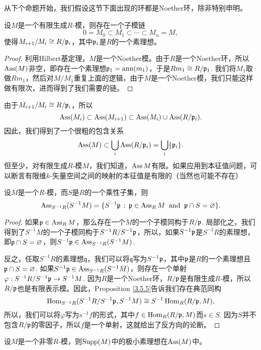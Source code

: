 从下个命题开始，我们假设这节下面出现的环都是Noether环，除非特别申明。

\begin{pro}
设$M$是一个有限生成$R$-模，则存在一个子模链
\[
	0=M_0\subset M_1\subset \cdots\subset M_n=M,
\]
使得$M_{i+1}/M_i\cong R/\mathfrak{p}_i$，其中$\mathfrak{p}_i$是$R$的一个素理想。
\end{pro}

\begin{proof}
利用Hilbert基定理，$M$是一个Noether模。由于$R$是一个Noether环，所以$\operatorname{Ass}(M)$非空，即存在一个素理想$\mathfrak{p}_1=\operatorname{ann}(m_1)$，于是$Rm_1\cong R/\mathfrak{p}_1$. 我们将$M_1$取做$Rm_1$，然后对$M/M_1$重复上面的逻辑，由于$M$是一个Noether模，我们只能这样做有限次，进而得到了我们需要的链。
\end{proof}

由于$M_{i+1}/M_i\cong R/\mathfrak{p}_i$，所以
\[
	\operatorname{Ass}(M_i)\subset \operatorname{Ass}(M_{i+1})\subset \operatorname{Ass}(M_i)\cup \operatorname{Ass}(R/\mathfrak{p}_i).
\]
因此，我们得到了一个很粗的包含关系
\[
	\operatorname{Ass}(M)\subset \bigcup_i \operatorname{Ass}(R/\mathfrak{p}_i)=\bigcup_i \{\mathfrak{p}_i\}.
\]
但至少，对有限生成$R$-模$M$，我们知道，$\operatorname{Ass} M$有限。如果应用到本征值问题，可以断言有限维$k$-矢量空间之间的映射的本征值是有限的（当然也可能不存在）

\begin{pro}
设$M$是一个$R$-模，而$S$是$R$的一个乘性子集，则
\[
	\operatorname{Ass}_{S^{-1}R}(S^{-1}M)=\{S^{-1}\mathfrak{p}\,:\,\mathfrak{p}\in \operatorname{Ass}_RM\;\;\text{and}\;\;\mathfrak p\cap S=\varnothing\}.
\]
\end{pro}

\begin{proof}
如果$\mathfrak{p}\in \operatorname{Ass}_R M$，那么存在一个$M$的一个子模同构于$R/\mathfrak{p}$. 局部化之，我们得到了$S^{-1}M$的一个子模同构于$S^{-1}R/S^{-1}\mathfrak{p}$，所以，如果$S^{-1}\mathfrak{p}$是$S^{-1}R$的素理想，即$\mathfrak{p}\cap S= \varnothing$，则$S^{-1}\mathfrak{p}\in\operatorname{Ass}_{S^{-1}R}(S^{-1}M)$.

反之，任取$S^{-1}R$的素理想$\mathfrak{q}$，我们可以将$\mathfrak{q}$写为$S^{-1}\mathfrak{p}$，其中$\mathfrak{p}$是$R$的一个素理想且$\mathfrak{p}\cap S=\varnothing$. 如果$S^{-1}\mathfrak{p}\in \operatorname{Ass}_{S^{-1}R}(S^{-1}M)$，则存在一个单射$\varphi:S^{-1}R/S^{-1}\mathfrak{p}\to S^{-1}M$. 因为$R$是一个Noether环，$R/\mathfrak{p}$是有限生成$R$-模，所以$R/\mathfrak{p}$也是有限表示模。因此，Proposition \ref{3.5.5}告诉我们存在典范同构
\[
	\operatorname{Hom}_{S^{-1}R}(S^{-1}R/S^{-1}\mathfrak{p},S^{-1}M)\cong S^{-1}\operatorname{Hom}_R(R/\mathfrak{p},M),
\]
所以，我们可以将$\varphi$写为$s^{-1}f$的形式，其中$f\in \operatorname{Hom}_R(R/\mathfrak{p},M)$而$s\in S$. 因为$S$并不包含$R/\mathfrak{p}$的零因子，所以$f$是一个单射，这就给出了反方向的论断。
\end{proof}

\begin{pro}\label{pro:5.1.9}
设$M$是一个非零$R$-模，则$\operatorname{Supp}(M)$中的极小素理想在$\operatorname{Ass} (M)$中。
\end{pro}

